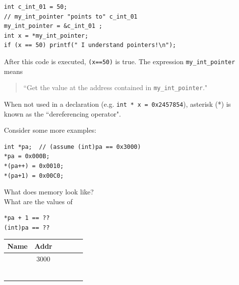 \begin{verbatim}
int c_int_01 = 50;
// my_int_pointer "points to" c_int_01
my_int_pointer = &c_int_01 ; 
int x = *my_int_pointer;
if (x == 50) printf(" I understand pointers!\n");
\end{verbatim}



%


After this code is executed, {\tt (x==50)} is true.  
The expression {\tt *my\_int\_pointer} means
\begin{quotation} 
   ``Get the value at the address contained in {\tt my\_int\_pointer}."
   \end{quotation}
When not used in a declaration (e.g. {\tt int * x = 0x2457854}),
asterisk (*) is known as the ``dereferencing operator".
   
   
Consider some more examples:

\begin{verbatim}
int *pa;  // (assume (int)pa == 0x3000)
*pa = 0x000B;
*(pa++) = 0x0010;
*(pa+1) = 0x00C0;
\end{verbatim}
What does memory look like? \\
What are the values of
\begin{verbatim}
*pa + 1 == ??
(int)pa == ??
\end{verbatim}

\begin{tabular}{l|c|c|c|c|c|}
\hline
Name &Addr & & & & \\ \hline
     & 3000 & & & & \\ \hline
     & & & & & \\ \hline
     & & & & & \\ \hline
     & & & & & \\ \hline
     & & & & & \\ \hline
     & & & & & \\ \hline
     & & & & & \\ \hline
\end{tabular}


